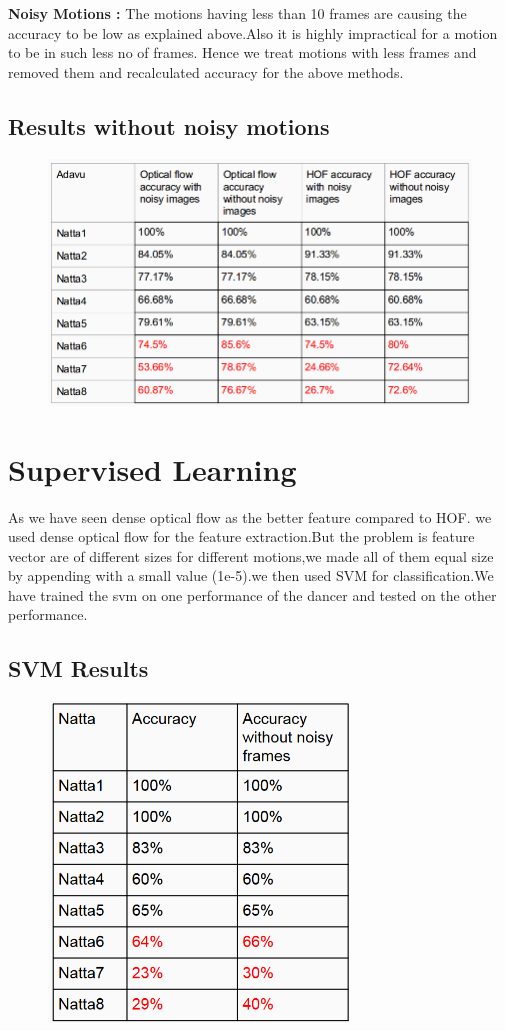 \textbf{Noisy Motions : } The motions having less than 10 frames are causing the accuracy to be low as explained above.Also it is highly impractical for a motion to be in such less no of frames. Hence we treat motions with less frames and removed them and recalculated accuracy for the above methods.

\subsection{Results without noisy motions}

\begin{figure} [H]
\centering
\includegraphics[width=120mm]{Pictures/res4.png}
\end{figure}


\section{Supervised Learning}

As we have seen dense optical flow as the better feature compared to HOF. we used dense optical flow for the feature extraction.But the problem is feature vector are of different sizes for different motions,we made all of them equal size by appending with a small value (1e-5).we then used SVM for classification.We have trained the svm on one performance of the dancer and tested on the other performance.

\subsection{SVM Results}

\begin{figure} [H]
\centering
\includegraphics[width=80mm]{Pictures/res5.png}
\end{figure}

